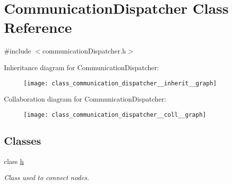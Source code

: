 \hypertarget{class_communication_dispatcher}{}\section{Communication\+Dispatcher Class Reference}
\label{class_communication_dispatcher}


{\ttfamily \#include $<$communication\+Dispatcher.\+h$>$}



Inheritance diagram for Communication\+Dispatcher\+:\nopagebreak
\begin{figure}[H]
\begin{center}
\leavevmode
\texttt{[image: class\_communication\_dispatcher\_\_inherit\_\_graph]}
\end{center}
\end{figure}


Collaboration diagram for Communication\+Dispatcher\+:\nopagebreak
\begin{figure}[H]
\begin{center}
\leavevmode
\texttt{[image: class\_communication\_dispatcher\_\_coll\_\_graph]}
\end{center}
\end{figure}
\subsection*{Classes}
\begin{DoxyCompactItemize}
\item 
class \hyperlink{class_communication_dispatcher_1_1h}{h}
\begin{DoxyCompactList}\small\item\em Class used to connect nodes. \end{DoxyCompactList}\end{DoxyCompactItemize}
